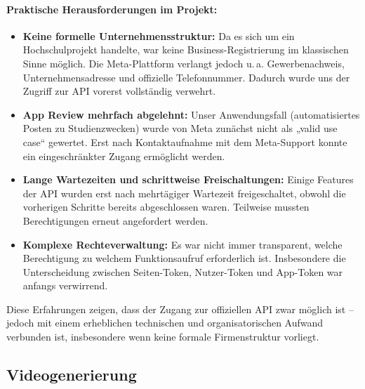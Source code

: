 \documentclass[a4paper,12pt]{article}
\begin{document}
\paragraph{Praktische Herausforderungen im Projekt:}
\begin{itemize}
    \item \textbf{Keine formelle Unternehmensstruktur:} Da es sich um ein Hochschulprojekt handelte, war keine Business-Registrierung im klassischen Sinne möglich. Die Meta-Plattform verlangt jedoch u.\,a. Gewerbenachweis, Unternehmensadresse und offizielle Telefonnummer. Dadurch wurde uns der Zugriff zur API vorerst vollständig verwehrt.
    
    \item \textbf{App Review mehrfach abgelehnt:} Unser Anwendungsfall (automatisiertes Posten zu Studienzwecken) wurde von Meta zunächst nicht als „valid use case“ gewertet. Erst nach Kontaktaufnahme mit dem Meta-Support konnte ein eingeschränkter Zugang ermöglicht werden.
    
    \item \textbf{Lange Wartezeiten und schrittweise Freischaltungen:} Einige Features der API wurden erst nach mehrtägiger Wartezeit freigeschaltet, obwohl die vorherigen Schritte bereits abgeschlossen waren. Teilweise mussten Berechtigungen erneut angefordert werden.
    
    \item \textbf{Komplexe Rechteverwaltung:} Es war nicht immer transparent, welche Berechtigung zu welchem Funktionsaufruf erforderlich ist. Insbesondere die Unterscheidung zwischen Seiten-Token, Nutzer-Token und App-Token war anfangs verwirrend.
\end{itemize}

Diese Erfahrungen zeigen, dass der Zugang zur offiziellen API zwar möglich ist – jedoch mit einem erheblichen technischen und organisatorischen Aufwand verbunden ist, insbesondere wenn keine formale Firmenstruktur vorliegt.


\subsection{Videogenerierung}
\end{document}
